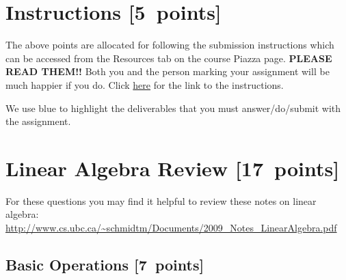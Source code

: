\documentclass{article}
\newcommand{\blu}[1]{{\textcolor{blu}{#1}}}
\let\ask\blu
\newcommand\pts[1]{\textcolor{pointscolour}{[#1~points]}}
\begin{document}
  \section*{Instructions \pts{5}}

  The above points are allocated for following the submission instructions which can be accessed from the Resources tab on the 
  course Piazza page. \textbf{PLEASE READ THEM!!} Both you and the person marking your assignment will be much happier if you do. Click \href{https://www.students.cs.ubc.ca/~cs-340/homework/submissioninstructions.pdf}{here} for the link to the instructions. 

  \vspace{1em}
  We use \ask{blue} to highlight the deliverables that you must answer/do/submit with the assignment.

  \section{Linear Algebra Review \pts{17}}

  For these questions you may find it helpful to review these notes on linear algebra:\\
  \url{http://www.cs.ubc.ca/~schmidtm/Documents/2009_Notes_LinearAlgebra.pdf}

  \subsection{Basic Operations \pts{7}}
\end{document}
